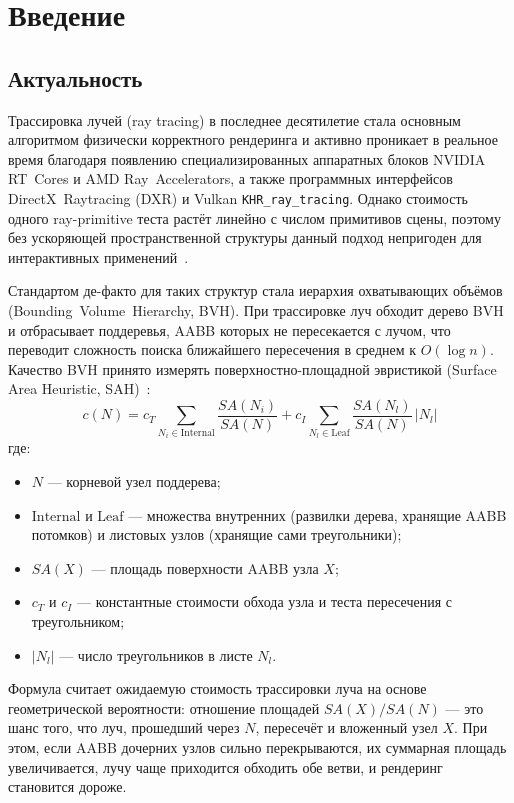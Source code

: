 \section{Введение}
\label{sec:Chapter0} 

\subsection{Актуальность}

Трассировка лучей (ray tracing) в последнее десятилетие стала
основным алгоритмом физически корректного рендеринга и активно
проникает в реальное время благодаря появлению специализированных
аппаратных блоков NVIDIA RT~Cores и AMD Ray~Accelerators, а также
программных интерфейсов DirectX~Raytracing (DXR) и Vulkan
\texttt{KHR\_ray\_tracing}. Однако стоимость одного ray-primitive
теста растёт линейно с числом примитивов сцены, поэтому без
ускоряющей пространственной структуры данный подход
непригоден для интерактивных применений~\cite{paper}.

Стандартом де-факто для таких структур стала иерархия охватывающих
объёмов (Bounding~Volume~Hierarchy, BVH). При трассировке луч
обходит дерево BVH и отбрасывает поддеревья, AABB которых не
пересекается с лучом, что переводит сложность поиска ближайшего
пересечения в среднем к $O(\log n)$. Качество BVH принято измерять
поверхностно-площадной эвристикой (Surface Area Heuristic, SAH)~\cite{paper, ganestam16_splitting}:
\begin{equation}
    c(N) = c_T \sum_{N_i \in \text{Internal}} \frac{SA(N_i)}{SA(N)} + c_I \sum_{N_l \in \text{Leaf}} \frac{SA(N_l)}{SA(N)}\,|N_l|
\end{equation}
где:
\begin{itemize}
    \item $N$ --- корневой узел поддерева;
    \item $\text{Internal}$ и $\text{Leaf}$ --- множества внутренних (развилки дерева, хранящие AABB потомков) и листовых узлов (хранящие сами треугольники);
    \item $SA(X)$ --- площадь поверхности AABB узла $X$;
    \item $c_T$ и $c_I$ --- константные стоимости обхода узла и теста пересечения с треугольником;
    \item $|N_l|$ --- число треугольников в листе $N_l$.
\end{itemize}

Формула считает ожидаемую стоимость трассировки луча на основе геометрической вероятности: отношение площадей $SA(X) / SA(N)$ --- это шанс того, что луч, прошедший через $N$, пересечёт и вложенный узел $X$. При этом, если AABB дочерних узлов сильно перекрываются, их суммарная площадь увеличивается, лучу чаще приходится обходить обе ветви, и рендеринг становится дороже.

